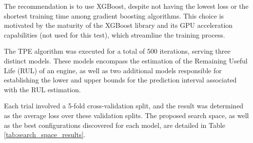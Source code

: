 \documentclass{IEEEtran}
\begin{document}
        The recommendation is to use XGBoost, despite not having the lowest loss or the shortest training time among gradient boosting algorithms. This choice is motivated by the maturity of the XGBoost library and its GPU acceleration capabilities (not used for this test), which streamline the training process.

        The TPE algorithm was executed for a total of 500 iterations, serving three distinct models. These models encompass the estimation of the Remaining Useful Life (RUL) of an engine, as well as two additional models responsible for establishing the lower and upper bounds for the prediction interval associated with the RUL estimation.

        Each trial involved a 5-fold cross-validation split, and the result was determined as the average loss over these validation splits. The proposed search space, as well as the best configurations discovered for each model, are detailed in Table \ref{tab:search_space_results}.
        \begin{table}[H]
            \caption{Hyperparameter Search Space for TPE and results for RUL estimators and, Lower and Upper Bounds}
            \label{tab:search_space_results}
            \centering
        \end{table}
\end{document}
